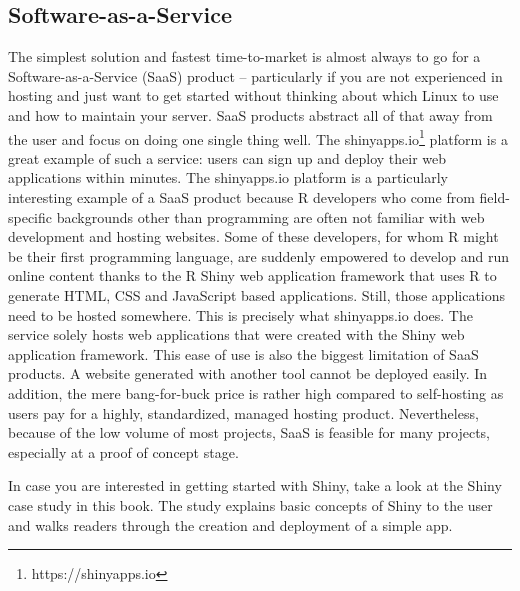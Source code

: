 \documentclass[
  12pt,
  letterpaper,
]{krantz}
\begin{document}
\hypertarget{software-as-a-service}{%
\subsection{Software-as-a-Service}\label{software-as-a-service}}

The simplest solution and fastest time-to-market is almost always to go
for a Software-as-a-Service (SaaS) product -- particularly
if you are not experienced in hosting and just want to get started
without thinking about which Linux to use and how to maintain your
server. SaaS products abstract all of that away from the user and focus
on doing one single thing well. The shinyapps.io\footnote{https://shinyapps.io}
platform is a great example of such a service: users can sign up and
deploy their web applications within minutes. The shinyapps.io platform
is a particularly interesting example of a SaaS product because R
developers who come from field-specific backgrounds other than
programming are often not familiar with web development and hosting
websites. Some of these developers, for whom R might be their first
programming language, are suddenly empowered to develop and run online
content thanks to the R Shiny web application framework that uses R to
generate HTML, CSS and JavaScript based
applications. Still, those applications need to be hosted somewhere.
This is precisely what shinyapps.io does. The service solely hosts web
applications that were created with the Shiny web application framework.
This ease of use is also the biggest limitation of SaaS products. A
website generated with another tool cannot be deployed easily. In
addition, the mere bang-for-buck price is rather high compared to
self-hosting as users pay for a highly, standardized, managed hosting
product. Nevertheless, because of the low volume of most projects, SaaS
is feasible for many projects, especially at a proof of concept stage.

\begin{tcolorbox}[enhanced jigsaw, colback=white, leftrule=.75mm, breakable, colframe=quarto-callout-note-color-frame, bottomrule=.15mm, arc=.35mm, opacityback=0, rightrule=.15mm, toprule=.15mm, left=2mm]
\begin{minipage}[t]{5.5mm}
\textcolor{quarto-callout-note-color}{\faInfo}
\end{minipage}%
\begin{minipage}[t]{\textwidth - 5.5mm}

In case you are interested in getting started with Shiny, take a look at
the Shiny case study in this book. The study explains basic concepts of
Shiny to the user and walks readers through the creation and deployment
of a simple app.

\end{minipage}%
\end{tcolorbox}
\end{document}
